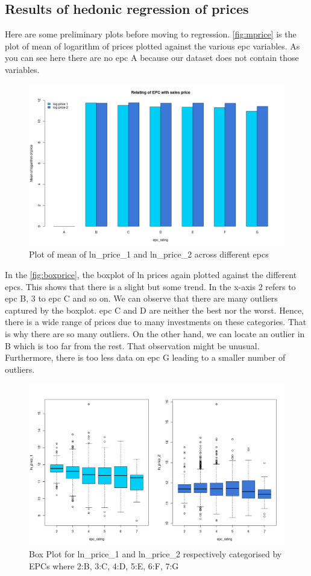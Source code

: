 \documentclass[12pt]{article}
\begin{document}
\subsection{Results of hedonic regression of prices}
Here are some preliminary plots before moving to regression. \autoref{fig:mprice} is the plot of mean of logarithm of prices plotted against the various \acrshort{epc} variables. As you can see here there are no \acrshort{epc} A because our dataset does not contain those variables.
\begin{figure}[H]
    \centering
    \includegraphics[width=12cm]{3.2. images/Rplot7.png}
    \caption{Plot of mean of ln\_price\_1 and ln\_price\_2 across different \acrshort{epc}s}
    \label{fig:mprice}
\end{figure}
In the \autoref{fig:boxprice}, the boxplot of ln prices again plotted against the different \acrshort{epc}s. This shows that there is a slight but some trend. In the x-axis 2 refers to \acrshort{epc} B, 3 to \acrshort{epc} C and so on. We can observe that there are many outliers captured by the boxplot. \acrshort{epc} C and D are neither the best nor the worst. Hence, there is a wide range of prices due to many investments on these categories. That is why there are so many outliers. On the other hand, we can locate an outlier in B which is too far from the rest. That observation might be unusual. Furthermore, there is too less data on \acrshort{epc} G leading to a smaller number of outliers.
\begin{figure}[H]
    \centering
    \includegraphics[width=16cm]{3.2. images/Rplot6.png}
    \caption{Box Plot for ln\_price\_1 and ln\_price\_2 respectively categorised by EPCs where 2:B, 3:C, 4:D, 5:E, 6:F, 7:G}
    \label{fig:boxprice}
\end{figure}
\end{document}
